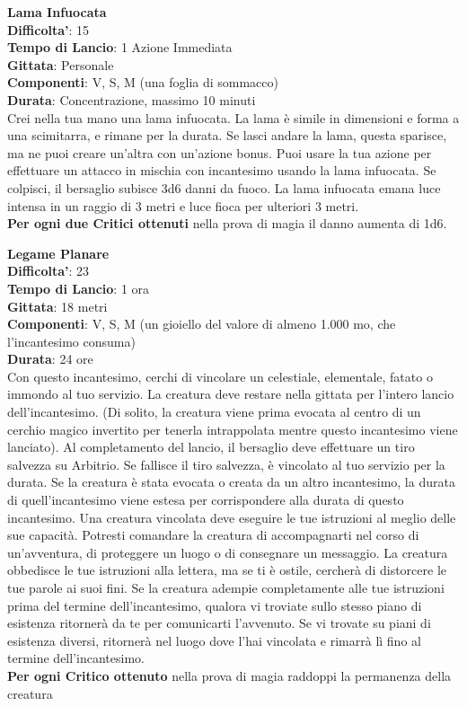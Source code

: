 \begin{multicols}{2}
\medskip\textbf{Lama Infuocata}\\
\textbf{Difficolta'}: 15\\
\textbf{Tempo di Lancio}: 1 Azione Immediata\\
\textbf{Gittata}: Personale\\
\textbf{Componenti}: V, S, M (una foglia di sommacco)\\
\textbf{Durata}: Concentrazione, massimo 10 minuti \\
Crei nella tua mano una lama infuocata. La lama è simile in dimensioni e forma a una scimitarra, e rimane per la durata. Se lasci andare la lama, questa sparisce, ma ne puoi creare un’altra con un’azione bonus. Puoi usare la tua azione per effettuare un attacco in mischia con incantesimo usando la lama infuocata. Se colpisci, il bersaglio subisce 3d6 danni da fuoco. La lama infuocata emana luce intensa in un raggio di 3 metri e luce fioca per ulteriori 3 metri.\\
\textbf{Per ogni due Critici ottenuti} nella prova di magia il danno aumenta di 1d6.

\medskip\textbf{Legame Planare}\\
\textbf{Difficolta'}: 23\\
\textbf{Tempo di Lancio}: 1 ora\\
\textbf{Gittata}: 18 metri\\
\textbf{Componenti}: V, S, M (un gioiello del valore di almeno 1.000 mo, che l’incantesimo consuma)\\
\textbf{Durata}: 24 ore\\
Con questo incantesimo, cerchi di vincolare un celestiale, elementale, fatato o immondo al tuo servizio. La creatura deve restare nella gittata per l’intero lancio dell’incantesimo. (Di solito, la creatura viene prima evocata al centro di un cerchio magico invertito per tenerla intrappolata mentre questo incantesimo viene lanciato). Al completamento del lancio, il bersaglio deve effettuare un tiro salvezza su Arbitrio. Se fallisce il tiro salvezza, è vincolato al tuo servizio per la durata. Se la creatura è stata evocata o creata da un altro incantesimo, la durata di quell’incantesimo viene estesa per corrispondere alla durata di questo incantesimo. Una creatura vincolata deve eseguire le tue istruzioni al meglio delle sue capacità. Potresti comandare la creatura di accompagnarti nel corso di un’avventura, di proteggere un luogo o di consegnare un messaggio. La creatura obbedisce le tue istruzioni alla lettera, ma se ti è ostile, cercherà di distorcere le tue parole ai suoi fini. Se la creatura adempie completamente alle tue istruzioni prima del termine dell’incantesimo, qualora vi troviate sullo stesso piano di esistenza ritornerà da te per comunicarti l’avvenuto. Se vi trovate su piani di esistenza diversi, ritornerà nel luogo dove l’hai vincolata e rimarrà lì fino al termine dell’incantesimo.\\
\textbf{Per ogni Critico ottenuto} nella prova di magia raddoppi la permanenza della creatura


\end{multicols}
